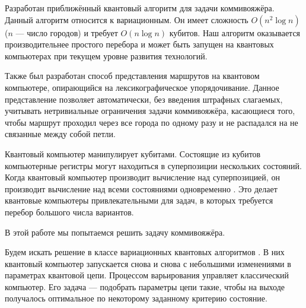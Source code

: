 

\usepackage{microtype}
\usepackage[extdef]{delimset}
\usepackage{csquotes} %
\usepackage{ragged2e}
\usepackage[hidelinks]{hyperref}

\DeclareMathOperator{\Rx}{Rx}
\DeclareMathOperator{\Ry}{Ry}
\DeclareMathOperator{\Rz}{Rz}

\DeclareMathOperator*{\argmin}{argmin}
\DeclareMathOperator{\arctantwo}{arctan2}




\setcounter{page}{2}



Разработан приближённый квантовый алгоритм для задачи коммивояжёра. Данный алгоритм относится к вариационным. Он имеет сложность $O(n^2 \log n)$ ($n$ --- число городов) и требует $O(n \log n)$ кубитов. Наш алгоритм оказывается производительнее простого перебора и может быть запущен на квантовых компьютерах при текущем уровне развития технологий.

Также был разработан способ представления маршрутов на квантовом компьютере, опирающийся на лексикографическое упорядочивание. Данное представление позволяет автоматически, без введения штрафных слагаемых, учитывать нетривиальные ограничения задачи коммивояжёра, касающиеся того, чтобы маршрут проходил через все города по одному разу и не распадался на не связанные между собой петли. 




Квантовый компьютер манипулирует кубитами. Состоящие из кубитов компьютерные регистры могут находиться в суперпозиции нескольких состояний. Когда квантовый компьютер производит вычисление над суперпозицией, он производит вычисление над всеми состояниями одновременно \cite{quantumComputers}. Это делает квантовые компьютеры привлекательными для задач, в которых требуется перебор большого числа вариантов. 

В этой работе мы попытаемся решить задачу коммивояжёра.

Будем искать решение в классе вариационных квантовых алгоритмов \cite{VQA}. В них квантовый компьютер запускается снова и снова с небольшими изменениями в параметрах квантовой цепи. Процессом варьирования управляет классический компьютер. Его задача --- подобрать параметры цепи такие, чтобы на выходе получалось оптимальное по некоторому заданному критерию состояние.

